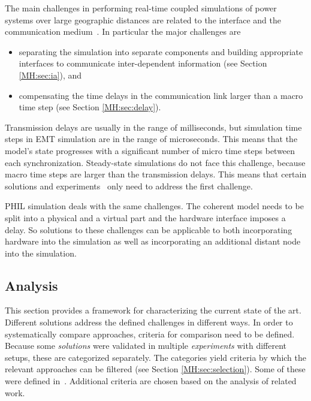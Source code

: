 \documentclass[a4paper]{atseminar}
\begin{document}
The main challenges in performing real-time coupled simulations of power systems over large geographic distances are related to the interface and the communication medium~\cite{montoya2020}. In particular the major challenges are

\begin{itemize}
    \item separating the simulation into separate components and building appropriate interfaces to communicate inter-dependent information (see Section \ref{MH:sec:ia}), and
    \item compensating the time delays in the communication link larger than a macro time step (see Section \ref{MH:sec:delay}).
\end{itemize}

Transmission delays are usually in the range of milliseconds, but simulation time steps in EMT simulation are in the range of microseconds. This means that the model's state progresses with a significant number of micro time steps between each synchronization.
Steady-state simulations do not face this challenge, because macro time steps are larger than the transmission delays. This means that certain solutions and experiments~\cite{palmintier2015, lundstrom2017, pellegrino2020} only need to address the first challenge.

PHIL simulation deals with the same challenges. The coherent model needs to be split into a physical and a virtual part and the hardware interface imposes a delay.
So solutions to these challenges can be applicable to both incorporating hardware into the simulation as well as incorporating an additional distant node into the simulation.

\subsection{Analysis}
\label{MH:sec:method}

This section provides a framework for characterizing the current state of the art.
Different solutions address the defined challenges in different ways. In order to systematically compare approaches, criteria for comparison need to be defined. Because some \textit{solutions} were validated in multiple \textit{experiments} with different setups, these are categorized separately. The categories yield criteria by which the relevant approaches can be filtered (see Section \ref{MH:sec:selection}). Some of these were defined in~\cite{syed2020standard}. Additional criteria are chosen based on the analysis of related work.
\end{document}
